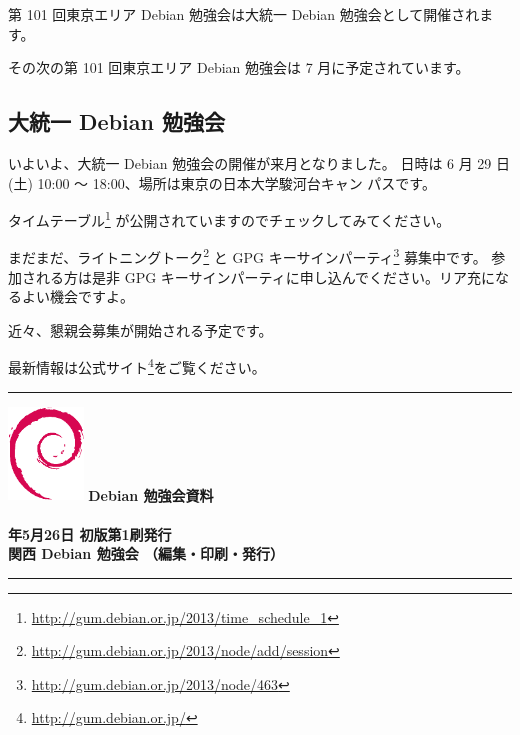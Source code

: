 \documentclass[mingoth,a4paper]{jsarticle}
\newcommand{\debmtgyear}{2013}
\newcommand{\debmtgdate}{26}
\newcommand{\debmtgmonth}{5}
\begin{document}
第 101 回東京エリア Debian 勉強会は大統一 Debian 勉強会として開催されます。

その次の第 101 回東京エリア Debian 勉強会は 7 月に予定されています。

\subsection{大統一 Debian 勉強会}

いよいよ、大統一 Debian 勉強会の開催が来月となりました。
日時は 6 月 29 日(土) 10:00 〜 18:00、場所は東京の日本大学駿河台キャン
パスです。

タイムテーブル\footnote{\url{http://gum.debian.or.jp/2013/time_schedule_1}}
が公開されていますのでチェックしてみてください。

まだまだ、ライトニングトーク\footnote{\url{http://gum.debian.or.jp/2013/node/add/session}}
と GPG キーサインパーティ\footnote{\url{http://gum.debian.or.jp/2013/node/463}}
募集中です。
参加される方は是非 GPG キーサインパーティに申し込んでください。リア充になるよい機会ですよ。

近々、懇親会募集が開始される予定です。

最新情報は公式サイト\footnote{\url{http://gum.debian.or.jp/}}をご覧ください。

%
\mbox{}\newpage
\mbox{}\newpage

\printindex

 \begin{minipage}[b]{0.2\hsize}
 \end{minipage}
 \begin{minipage}[b]{0.8\hsize}

 \vspace*{15cm}
 \rule{\hsize}{1mm}
 \vspace{2mm}
 \includegraphics[width=2cm]{image200502/openlogo-nd.eps}
 \noindent \Large \bf Debian 勉強会資料\\ \\
 \noindent \normalfont \debmtgyear{}年\debmtgmonth{}月\debmtgdate{}日 \hspace{5mm}  初版第1刷発行\\
 \noindent \normalfont 関西 Debian 勉強会 （編集・印刷・発行）\\
 \rule{\hsize}{1mm}
 \end{minipage}
\end{document}
